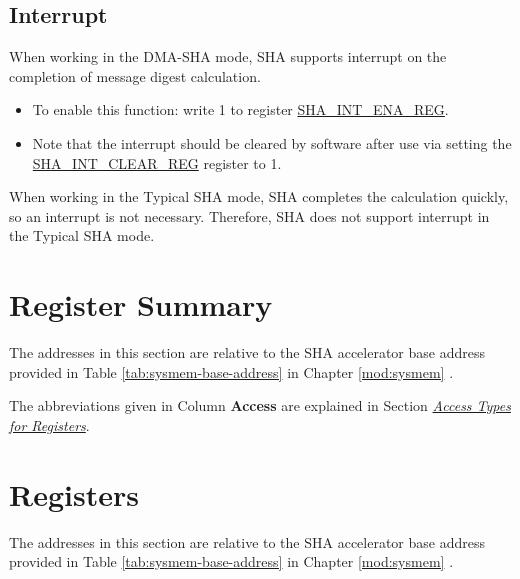 \documentclass[main\_\_EN.tex]{subfiles}
\begin{document}
\subsection{Interrupt}

When working in the DMA-SHA mode, SHA supports interrupt on the completion of message digest calculation.
\begin{itemize}
    \item To enable this function: write 1 to register \hyperref[regdesc:SHAINTENAREG]{SHA\_INT\_ENA\_REG}.
    \item Note that the interrupt should be cleared by software after use via setting the \hyperref[regdesc:SHAINTCLEARREG]{SHA\_INT\_CLEAR\_REG} register to 1.
\end{itemize}

When working in the Typical SHA mode, SHA completes the calculation quickly, so an interrupt is not necessary. Therefore, SHA does not support interrupt in the Typical SHA mode.


\clearpage
\hypertarget{sha-reg-summ}{}
\section{Register Summary} \label{sec:sha-reg-summ}

The addresses in this section are relative to the SHA accelerator base address provided in Table \ref{tab:sysmem-base-address} in Chapter \ref{mod:sysmem} \textit{}.

The abbreviations given in Column \textbf{Access} are explained in Section \hyperref[glossary-access-types]{\textit{Access Types for Registers}}.



\section{Registers}

The addresses in this section are relative to the SHA accelerator base address provided in Table \ref{tab:sysmem-base-address} in Chapter \ref{mod:sysmem} \textit{}.


\end{document}
